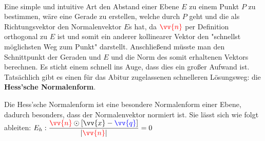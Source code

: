         \paragraph{} Eine simple und intuitive Art den Abstand einer Ebene $E$ zu einem Punkt $P$ zu bestimmen, wäre eine Gerade
        zu erstellen, welche durch $P$ geht und die als Richtungsvektor den Normalenvektor $E$s hat, da $\textcolor{red}{\vv{n}}$
        per Definition orthogonal zu $E$ ist und somit ein anderer kollinearer Vektor den "schnellst möglichsten Weg zum Punkt"
        darstellt. Anschließend müsste man den Schnittpunkt der Geraden und $E$ und die Norm des somit erhaltenen Vektors berechnen.
        Es sticht einem schnell ins Auge, dass dies ein großer Aufwand ist. Tatsächlich gibt es einen für das Abitur zugelassenen
        schnelleren Lösungsweg: die \textbf{Hess'sche Normalenform}.
        \\
        \begin{Definition}
            Die Hess'sche Normalenform ist eine besondere Normalenform einer Ebene, dadurch besonders, dass der Normalenvektor
            normiert ist. Sie lässt sich wie folgt ableiten:
            $E_h: \dfrac{\textcolor{red}{\vv{n}} \odot [\vv{x} - \textcolor{blue}{\vv{q}}]}{|\textcolor{red}{\vv{n}}|} = 0$
        \end{Definition}
        \\
        \\
